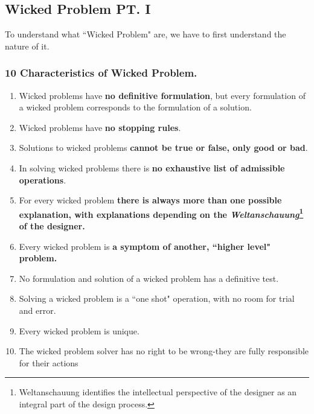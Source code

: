 \documentclass[11pt, twocolumn]{article}
\begin{document}
		\subsection{Wicked Problem PT. I}
		To understand what ``Wicked Problem" are, we have to first understand the nature of it.
			\subsubsection{10 Characteristics of Wicked Problem.}
				\begin{enumerate}
					\item Wicked problems have \textbf{no definitive formulation}, but every formulation of a wicked problem corresponds to the formulation of a solution.
					\item Wicked problems have \textbf{no stopping rules}.
					\item Solutions to wicked problems \textbf{cannot be true or false, only good or bad}.
					\item  In solving wicked problems there is \textbf{no exhaustive list of admissible operations}.
					\item For every wicked problem \textbf{there is always more than one possible explanation, with explanations depending on the \textit{Weltanschauung}\footnote{Weltanschauung identifies the intellectual perspective of the designer as an integral part of the design process.} of the designer.}
					\item Every wicked problem is \textbf{a symptom of another, ``higher level" problem.} 
					\item No formulation and solution of a wicked problem has a definitive test.
					\item Solving a wicked problem is a ``one shot" operation, with no room for trial and error.
					\item Every wicked problem is unique.
					\item The wicked problem solver has no right to be wrong-they are fully responsible for their actions
				\end{enumerate}
\newpage
\end{document}

